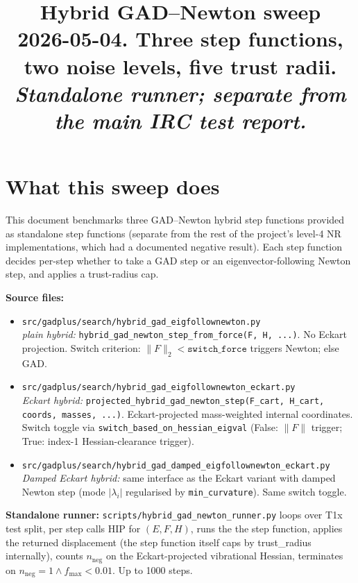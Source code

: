 \documentclass[11pt]{article}
\title{\Large\textbf{Hybrid GAD--Newton sweep}\\[4pt]
\normalsize 2026-05-04. Three step functions, two noise levels, five trust radii.\\[2pt]
\normalsize \emph{Standalone runner; separate from the main IRC test report.}}
\author{}
\date{}
\begin{document}
\maketitle
\thispagestyle{empty}

\section*{What this sweep does}

This document benchmarks three GAD--Newton hybrid step functions provided
as standalone step functions (separate from the rest of the project's level-4 NR
implementations, which had a documented negative result). Each step
function decides per-step whether to take a GAD step or an
eigenvector-following Newton step, and applies a trust-radius cap.

\textbf{Source files:}
\begin{itemize}[leftmargin=1.5em, itemsep=0.05em]
\item \texttt{src/gadplus/search/hybrid\_gad\_eigfollownewton.py}
  \\ \emph{plain hybrid:} \texttt{hybrid\_gad\_newton\_step\_from\_force(F, H, ...)}.
  No Eckart projection. Switch criterion: $\|F\|_2 < \mathtt{switch\_force}$
  triggers Newton; else GAD.
\item \texttt{src/gadplus/search/hybrid\_gad\_eigfollownewton\_eckart.py}
  \\ \emph{Eckart hybrid:} \texttt{projected\_hybrid\_gad\_newton\_step(F\_cart, H\_cart, coords, masses, ...)}.
  Eckart-projected mass-weighted internal coordinates. Switch toggle
  via \texttt{switch\_based\_on\_hessian\_eigval} (False: $\|F\|$ trigger;
  True: index-1 Hessian-clearance trigger).
\item \texttt{src/gadplus/search/hybrid\_gad\_damped\_eigfollownewton\_eckart.py}
  \\ \emph{Damped Eckart hybrid:} same interface as the Eckart variant
  with damped Newton step (mode $|\lambda_i|$ regularised by
  \texttt{min\_curvature}). Same switch toggle.
\end{itemize}

\textbf{Standalone runner:} \texttt{scripts/hybrid\_gad\_newton\_runner.py}
loops over T1x test split, per step calls HIP for $(E, F, H)$, runs the
the step function, applies the returned displacement (the step
function itself caps by trust\_radius internally), counts $n_{\text{neg}}$
on the Eckart-projected vibrational Hessian, terminates on
$n_{\text{neg}}{=}1 \wedge f_{\max}{<}0.01$. Up to 1000 steps.
\end{document}
